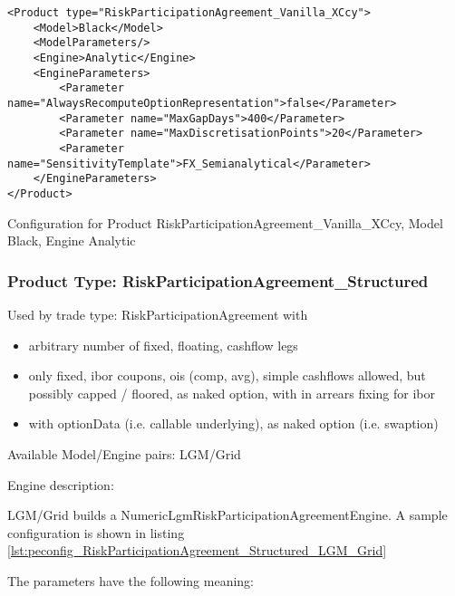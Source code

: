 \begin{longlisting}
\begin{verbatim}
<Product type="RiskParticipationAgreement_Vanilla_XCcy">
    <Model>Black</Model>
    <ModelParameters/>
    <Engine>Analytic</Engine>
    <EngineParameters>
        <Parameter name="AlwaysRecomputeOptionRepresentation">false</Parameter>
        <Parameter name="MaxGapDays">400</Parameter>
        <Parameter name="MaxDiscretisationPoints">20</Parameter>
        <Parameter name="SensitivityTemplate">FX_Semianalytical</Parameter>
    </EngineParameters>
</Product>
\end{verbatim}
\caption{Configuration for Product RiskParticipationAgreement\_Vanilla\_XCcy, Model Black, Engine Analytic}
\label{lst:peconfig_RiskParticipationAgreement_Vanilla_XCcy_Black_Analytic}
\end{longlisting}

\subsubsection{Product Type: RiskParticipationAgreement\_Structured}

Used by trade type: RiskParticipationAgreement with

\begin{itemize}
\item arbitrary number of fixed, floating, cashflow legs
\item only fixed, ibor coupons, ois (comp, avg), simple cashflows allowed, but possibly capped / floored,
  as naked option, with in arrears fixing for ibor
\item with optionData (i.e. callable underlying), as naked option (i.e. swaption)
\end{itemize} 

Available Model/Engine pairs: LGM/Grid

Engine description:

LGM/Grid builds a NumericLgmRiskParticipationAgreementEngine. A sample configuration is shown in listing
\ref{lst:peconfig_RiskParticipationAgreement_Structured_LGM_Grid}

The parameters have the following meaning:

